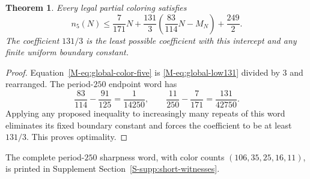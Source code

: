 \documentclass[11pt,reqno]{amsart}
\theoremstyle{plain}
\newtheorem{theorem}{Theorem}
\theoremstyle{plain}
\theoremstyle{plain}
\begin{document}
\begin{theorem}\label{M-thm:global-color-five}
Every legal partial coloring satisfies
\begin{equation}\label{M-eq:global-color-five}
 n_5(N)\le\frac7{171}N+
 \frac{131}{3}\left(\frac{83}{114}N-M_N\right)+\frac{249}{2}.
\end{equation}
The coefficient $131/3$ is the least possible coefficient with this
intercept and any finite uniform boundary constant.
\end{theorem}
\begin{proof}
Equation~\eqref{M-eq:global-color-five} is
\eqref{M-eq:global-low131} divided by $3$ and rearranged.
The period-$250$ endpoint word has
\[
 \frac{83}{114}-\frac{91}{125}=\frac1{14250},\qquad
 \frac{11}{250}-\frac7{171}=\frac{131}{42750}.
\]
Applying any proposed inequality to increasingly many repeats of this
word eliminates its fixed boundary constant and forces the coefficient
to be at least $131/3$. This proves optimality.
\end{proof}
The complete period-$250$ sharpness word, with color counts
$(106,35,25,16,11)$, is printed in Supplement
Section~\ref*{S-supp:short-witnesses}.
\end{document}
